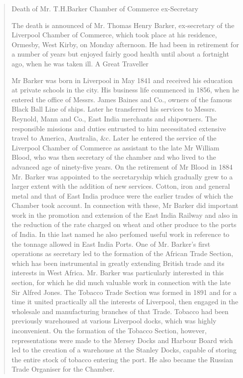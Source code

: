 \begin{quotation}
Death of Mr. T.H.Barker
Chamber of Commerce ex-Secretary

The death is announced of Mr. Thomas Henry Barker, ex-secretary of the Liverpool Chamber of Commerce, which took place at his residence, Ormesby, West Kirby, on Monday afternoon. He had been in retirement for a number of years but enjoyed fairly good health until about a fortnight ago, when he was taken ill.
A Great Traveller

Mr Barker was born in Liverpool in May 1841 and received his education at private schools in the city. His business life commenced in 1856, when he entered the office of Messrs. James Baines and Co., owners of the famous Black Ball Line of ships.  Later he transferred his services to Messrs. Reynold, Mann and Co., East India merchants and shipowners.  The responsible missions and duties entrusted to him necessitated extensive travel to America, Australia, \&c.  Later he entered the service of the Liverpool Chamber of Commerce as assistant to the late Mr William Blood, who was then secretary of the chamber and who lived to the advanced age of ninety-five years.  On the retirement of Mr Blood in 1884 Mr. Barker was appointed to the secretaryship which gradually grew to a larger extent with the addition of new services. Cotton, iron and general metal and that of East India produce were the earlier trades of which the Chamber took account.  In connection with these, Mr Barker did important work in the promotion and extension of the East India Railway and also in the reduction of the rate charged on wheat and other produce to the ports of India. In thie last named he also perfomed useful work in reference to the tonnage allowed in East India Ports.
One of Mr. Barker's first operations as secretary led to the formation of the African Trade Section, which has been instrumental in greatly extending British trade and its interests in West Africa. Mr. Barker was particularly interested in this section, for which he did much valuable work in connection with the late Sir Alfred Jones.  The Tobacco Trade Section was formed in 1891 and for a time it united practically all the interests of Liverpool, then engaged in the wholesale and manufacturing branches of that Trade.  Tobacco had been previously warehoused at various Liverpool docks, which was highly inconvenient.  On the formation of the Tobacco Section, however, representations were made to the Mersey Docks and Harbour Board wich led to the creation of a warehouse at the Stanley Docks, capable of storing the entire stock of tobacco entering the port.  He also became the Russian Trade Organiser for the Chamber.


\end{quotation}
